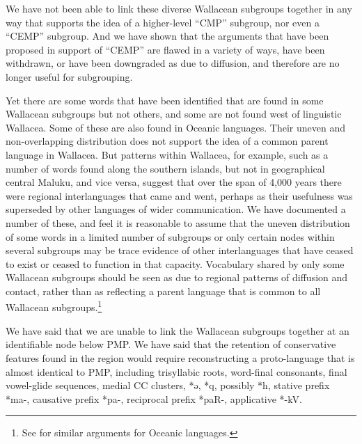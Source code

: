 We have not been able to link these diverse Wallacean subgroups
together in any way that supports the idea of a higher-level
“CMP” subgroup, nor even a “CEMP” subgroup.
And we have shown that the arguments that have been proposed
in support of “CEMP” are flawed in a variety of ways,
have been withdrawn, or have been downgraded as due to diffusion,
and therefore are no longer useful for subgrouping.

Yet there are some words that have been identified that are found
in some Wallacean subgroups but not others,
and some are not found west of linguistic Wallacea.
Some of these are also found in Oceanic languages.
Their uneven and non-overlapping distribution does not support
the idea of a common parent language in Wallacea.
But patterns within Wallacea,
for example, such as a number of words found along the southern
islands, but not in geographical central Maluku,
and vice versa, suggest that over the span of 4,000 years there
were regional interlanguages that came
and went, perhaps as their usefulness was superseded by other
languages of wider communication.
We have documented a number of these,
and feel it is reasonable to assume that the uneven distribution
of some words in a limited number of subgroups or only certain
 nodes within several subgroups may be trace evidence of other
interlanguages that have ceased to exist or ceased to function in that capacity.
Vocabulary shared by only some Wallacean subgroups should be
seen as due to regional patterns of diffusion
and contact, rather than as reflecting a parent language that
is common to all Wallacean subgroups.\footnote{
See \citet{Ross2017}
for similar arguments for Oceanic languages.}

We have said that we are unable to link the Wallacean subgroups
together at an identifiable node below PMP.
We have said that the retention of conservative features found
in the region would require reconstructing a proto-language that
is almost identical to PMP,
including trisyllabic roots, word-final consonants,
final vowel-glide sequences, medial CC clusters,
*ə, *q, possibly *h, stative prefix *ma-, causative prefix *pa-,
reciprocal prefix *paR-, applicative *-kV.

